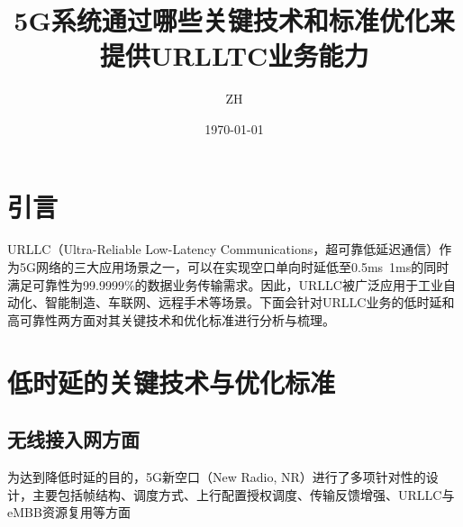\documentclass[12pt,a4paper,oneside]{article}
\title{5G系统通过哪些关键技术和标准优化来提供URLLTC业务能力}
\author{ZH}
\date{\today}
\begin{document}
\maketitle

\section{引言}
URLLC（Ultra-Reliable Low-Latency Communications，超可靠低延迟通信）作为5G网络的三大应用场景之一，可以在实现空口单向时延低至0.5ms~1ms的同时满足可靠性为99.9999\%的数据业务传输需求。因此，URLLC被广泛应用于工业自动化、智能制造、车联网、远程手术等场景。下面会针对URLLC业务的低时延和高可靠性两方面对其关键技术和优化标准进行分析与梳理。

\section{低时延的关键技术与优化标准}

\subsection{无线接入网方面}
为达到降低时延的目的，5G新空口（New Radio, NR）进行了多项针对性的设计，主要包括帧结构、调度方式、上行配置授权调度、传输反馈增强、URLLC与eMBB资源复用等方面
\end{document}

